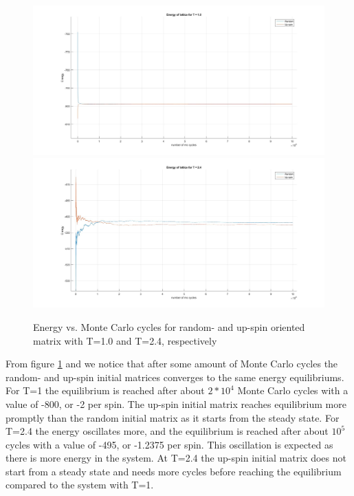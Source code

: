 \documentclass[10pt,a4paper]{article}
\begin{document}
\begin{figure}[H]
\centerline{
\includegraphics[scale=0.15]{energy1T}
\includegraphics[scale=0.15]{energy24T}
}
\caption{Energy vs. Monte Carlo cycles for random- and up-spin oriented matrix with T=1.0 and T=2.4, respectively}
\label{fig:energy}
\end{figure}
\noindent From figure \ref{fig:energy} and we notice that after some amount of Monte Carlo cycles the random- and up-spin initial matrices converges to the same energy equilibriums. For T=1 the equilibrium is reached after about $2*10^4$ Monte Carlo cycles with a value of -800, or -2 per spin. The up-spin initial matrix reaches equilibrium more promptly than the random initial matrix as it starts from the steady state. For T=2.4 the energy oscillates more, and the equilibrium is reached after about $10^5$ cycles with a value of -495, or  -1.2375 per spin. This oscillation is expected as there is more energy in the system. At T=2.4 the up-spin initial matrix does not start from a steady state and needs more cycles before reaching the equilibrium compared to the system with T=1.
\end{document}
